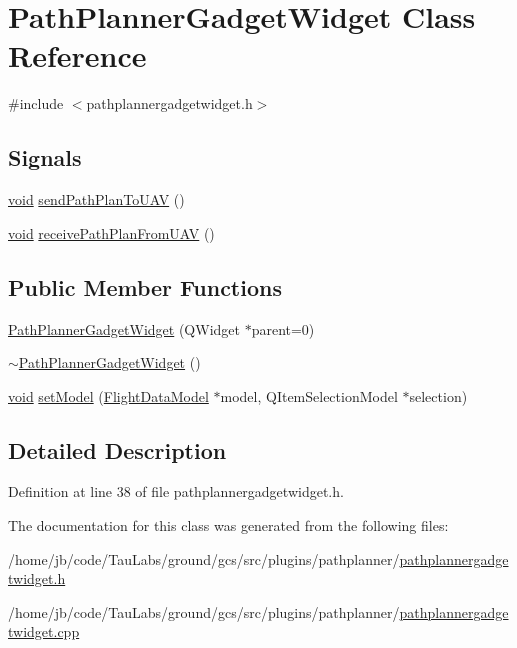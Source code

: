 \hypertarget{class_path_planner_gadget_widget}{\section{\-Path\-Planner\-Gadget\-Widget \-Class \-Reference}
\label{class_path_planner_gadget_widget}
}


{\ttfamily \#include $<$pathplannergadgetwidget.\-h$>$}

\subsection*{\-Signals}
\begin{DoxyCompactItemize}
\item 
\hyperlink{group___u_a_v_objects_plugin_ga444cf2ff3f0ecbe028adce838d373f5c}{void} \hyperlink{group___path_planner_gadget_plugin_ga65ade0264344b0cf65707fda3419f091}{send\-Path\-Plan\-To\-U\-A\-V} ()
\item 
\hyperlink{group___u_a_v_objects_plugin_ga444cf2ff3f0ecbe028adce838d373f5c}{void} \hyperlink{group___path_planner_gadget_plugin_ga4da1c30707d66e4e343263500573eb39}{receive\-Path\-Plan\-From\-U\-A\-V} ()
\end{DoxyCompactItemize}
\subsection*{\-Public \-Member \-Functions}
\begin{DoxyCompactItemize}
\item 
\hyperlink{group___path_planner_gadget_plugin_gaa5a16b8b25c368ba63764246fe417001}{\-Path\-Planner\-Gadget\-Widget} (\-Q\-Widget $\ast$parent=0)
\item 
\hyperlink{group___path_planner_gadget_plugin_ga7a9758a518eef6a55f9386ed8a552e29}{$\sim$\-Path\-Planner\-Gadget\-Widget} ()
\item 
\hyperlink{group___u_a_v_objects_plugin_ga444cf2ff3f0ecbe028adce838d373f5c}{void} \hyperlink{group___path_planner_gadget_plugin_ga906747f7512d66ab544506fdd8ba5fc2}{set\-Model} (\hyperlink{class_flight_data_model}{\-Flight\-Data\-Model} $\ast$model, \-Q\-Item\-Selection\-Model $\ast$selection)
\end{DoxyCompactItemize}


\subsection{\-Detailed \-Description}


\-Definition at line 38 of file pathplannergadgetwidget.\-h.



\-The documentation for this class was generated from the following files\-:\begin{DoxyCompactItemize}
\item 
/home/jb/code/\-Tau\-Labs/ground/gcs/src/plugins/pathplanner/\hyperlink{pathplannergadgetwidget_8h}{pathplannergadgetwidget.\-h}\item 
/home/jb/code/\-Tau\-Labs/ground/gcs/src/plugins/pathplanner/\hyperlink{pathplannergadgetwidget_8cpp}{pathplannergadgetwidget.\-cpp}\end{DoxyCompactItemize}
